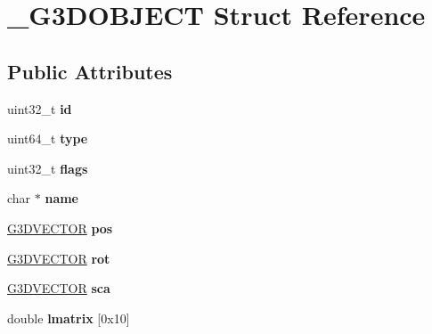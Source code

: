 \hypertarget{struct__G3DOBJECT}{}\section{\+\_\+\+G3\+D\+O\+B\+J\+E\+CT Struct Reference}
\label{struct__G3DOBJECT}
\subsection*{Public Attributes}
\begin{DoxyCompactItemize}
\item 
\mbox{\label{struct__G3DOBJECT_a69681d20105aefe83abbc3d59d2f561c}} 
uint32\+\_\+t {\bfseries id}
\item 
\mbox{\label{struct__G3DOBJECT_a11eb99cc5843ff98073188bd286651c1}} 
uint64\+\_\+t {\bfseries type}
\item 
\mbox{\label{struct__G3DOBJECT_ab507547d4c680ea5110a798df8bf1d3d}} 
uint32\+\_\+t {\bfseries flags}
\item 
\mbox{\label{struct__G3DOBJECT_a3eabe10b862e2ea77791290e3f9f141c}} 
char $\ast$ {\bfseries name}
\item 
\mbox{\label{struct__G3DOBJECT_a51b3e335e7f3c8e91bb9578a9ee78ba0}} 
\hyperlink{struct__G3DVECTOR}{G3\+D\+V\+E\+C\+T\+OR} {\bfseries pos}
\item 
\mbox{\label{struct__G3DOBJECT_a5632596d106877925c15dff0fc01874c}} 
\hyperlink{struct__G3DVECTOR}{G3\+D\+V\+E\+C\+T\+OR} {\bfseries rot}
\item 
\mbox{\label{struct__G3DOBJECT_aa148a60e9a33aa85aa937c18e101502c}} 
\hyperlink{struct__G3DVECTOR}{G3\+D\+V\+E\+C\+T\+OR} {\bfseries sca}
\item 
\mbox{\label{struct__G3DOBJECT_a419a6f6de03c8b069eddf638a09b035f}} 
double {\bfseries lmatrix} \mbox{[}0x10\mbox{]}
\item 
\mbox{\label{struct__G3DOBJECT_a34b0fbe4b519638ade1102fc27e000fc}} 

\end{DoxyCompactItemize}
